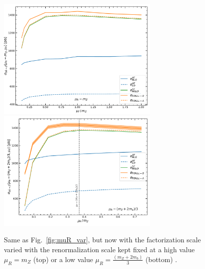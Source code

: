 \documentclass[12pt]{article}
\begin{document}
\begin{figure}
  \begin{center}
    \includegraphics[width=0.7\textwidth]{muF_mh_var.pdf}
    \includegraphics[width=0.7\textwidth]{muF_var.pdf} 
    \caption{\label{fig:muF_var} Same as Fig.~\ref{fig:muR_var}, but now
      with the factorization scale varied with the renormalization scale
      kept fixed at a high value 
      $\mu_R=m_Z$  (top) or a low value  $\mu_R=\frac{(m_Z+2m_b)}{3}$ (bottom) .}
  \end{center}
\end{figure}
\end{document}

